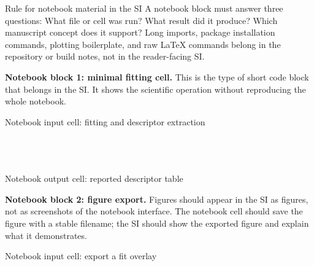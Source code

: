 \documentclass[journal=jacsat,manuscript=article]{achemso}
\begin{document}
\begin{greenbox}{Rule for notebook material in the SI}
	A notebook block must answer three questions: What file or cell was run? What
	result did it produce? Which manuscript concept does it support? Long imports,
	package installation commands, plotting boilerplate, and raw \LaTeX{} commands
	belong in the repository or build notes, not in the reader-facing SI.
\end{greenbox}

\noindent\textbf{Notebook block 1: minimal fitting cell.}
This is the type of short code block that belongs in the SI. It shows the
scientific operation without reproducing the whole notebook.

\begin{bluebox}{Notebook input cell: fitting and descriptor extraction}
\small
\noindent\texttt{}\\
\texttt{}\\
\texttt{}\\
\texttt{}\\
\texttt{}
\end{bluebox}

\begin{greenbox}{Notebook output cell: reported descriptor table}
\small
\noindent\texttt{}\\
\texttt{}
\end{greenbox}

\noindent\textbf{Notebook block 2: figure export.}
Figures should appear in the SI as figures, not as screenshots of the notebook
interface. The notebook cell should save the figure with a stable filename; the
SI should show the exported figure and explain what it demonstrates.

\begin{bluebox}{Notebook input cell: export a fit overlay}
\small
\noindent\texttt{}\\
\texttt{}
\end{bluebox}
\end{document}
